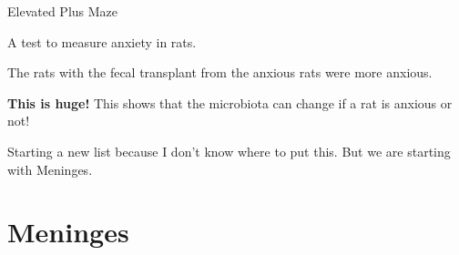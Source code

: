 \begin{coloredlist}
\begin{coloredlist}
\begin{coloredlist}
            \item Elevated Plus Maze
            \begin{coloredlist}
                \item A test to measure anxiety in rats.
                \item The rats with the fecal transplant from the anxious rats were more anxious.
                \item \textbf{This is huge!} This shows that the microbiota can change if a rat is anxious or not!
            \end{coloredlist}
        \end{coloredlist}
    \end{coloredlist}
\end{coloredlist}

Starting a new list because I don't know where to put this. But we are starting with Meninges.

\section{Meninges}

